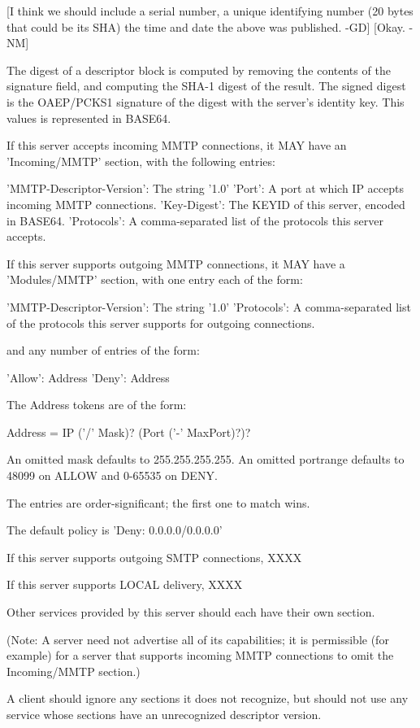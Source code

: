 [I think we should include a serial number, a unique identifying
number (20 bytes that could be its SHA) the time and date the above
was published. -GD]
[Okay. -NM]

The digest of a descriptor block is computed by removing the contents
of the signature field, and computing the SHA-1 digest of
the result.  The signed digest is the OAEP/PCKS1 signature of the
digest with the server's identity key.  This values is
represented in BASE64.

If this server accepts incoming MMTP connections, it MAY have an
'Incoming/MMTP' section, with the following entries:

     'MMTP-Descriptor-Version': The string '1.0'
     'Port': A port at which IP accepts incoming MMTP connections.
     'Key-Digest': The KEYID of this server, encoded in BASE64.
     'Protocols': A comma-separated list of the protocols this
           server accepts.

If this server supports outgoing MMTP connections, it MAY have a
'Modules/MMTP' section, with one entry each of the form:

      'MMTP-Descriptor-Version': The string '1.0'
      'Protocols': A comma-separated list of the protocols this server
           supports for outgoing connections.

and any number of entries of the form:

      'Allow': Address
      'Deny': Address

The Address tokens are of the form:

   Address = IP ('/' Mask)? (Port ('-' MaxPort)?)?

An omitted mask defaults to 255.255.255.255.  An omitted portrange
defaults to 48099 on ALLOW and 0-65535 on DENY.

The entries are order-significant; the first one to match wins.

The default policy is 'Deny: 0.0.0.0/0.0.0.0'

If this server supports outgoing SMTP connections, XXXX

If this server supports LOCAL delivery, XXXX

Other services provided by this server should each have their own section.

(Note: A server need not advertise all of its capabilities; it is
permissible (for example) for a server that supports incoming MMTP
connections to omit the Incoming/MMTP section.)

A client should ignore any sections it does not recognize, but should
not use any service whose sections have an unrecognized descriptor
version.

